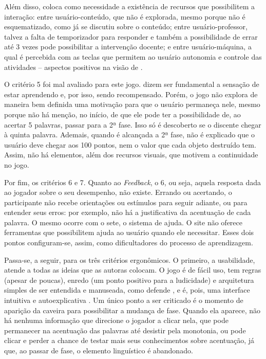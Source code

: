 \documentclass{textolivre}
\begin{document}
Além disso, \textcite{ribeiro2013} coloca como necessidade a existência de recursos que possibilitem a interação: entre usuário-conteúdo, que não é explorada, mesmo porque não é esquematizado, como já se discutiu sobre o conteúdo; entre usuário-professor, talvez a falta de temporizador para responder e também a possibilidade de errar até 3 vezes pode possibilitar a intervenção docente; e entre usuário-máquina, a qual é percebida com as teclas que permitem ao usuário autonomia e controle das atividades  – aspectos positivos na visão de \textcite{ribeiro2013}.

O critério 5 foi mal avaliado para este jogo. \textcite{ribeiro2009} dizem ser fundamental a sensação de estar aprendendo e, por isso, sendo recompensado. Porém, o jogo não explora de maneira bem definida uma motivação para que o usuário permaneça nele, mesmo porque não há menção, no início, de que ele pode ter a possibilidade de, ao acertar 5 palavras, passar para a 2ª fase. Isso só é descoberto se o discente chegar à quinta palavra. Ademais, quando é alcançada a 2ª fase, não é explicado que o usuário deve chegar aos 100 pontos, nem o valor que cada objeto destruído tem. Assim, não há elementos, além dos recursos visuais, que motivem a continuidade no jogo.

Por fim, os critérios 6 e 7. Quanto ao \emph{Feedback}, o 6, ou seja, aquela resposta dada ao jogador sobre o seu desempenho, não existe. Errando ou acertando, o participante não recebe orientações ou estímulos para seguir adiante, ou para entender seus erros: por exemplo, não há a justificativa da acentuação de cada palavra. O mesmo ocorre com o sete, o sistema de ajuda. O site não oferece ferramentas que possibilitem ajuda ao usuário quando ele necessitar. Esses dois pontos configuram-se, assim, como dificultadores do processo de aprendizagem.

Passa-se, a seguir, para os três critérios ergonômicos. O primeiro, a usabilidade, atende a todas as ideias que as autoras colocam. O jogo é de fácil uso, tem regras (apesar de poucas), enredo (um ponto positivo para a ludicidade) e arquitetura simples de ser entendida e manuseada, como defende \textcite{ribeiro2013}, e é, pois, uma interface intuitiva e autoexplicativa \cite{ribeiro2009}. Um único ponto a ser criticado é o momento de aparição da caveira para possibilitar a mudança de fase. Quando ela aparece, não há nenhuma informação que direcione o jogador a clicar nela, que pode permanecer na acentuação das palavras até desistir pela monotonia, ou pode clicar e perder a chance de testar mais seus conhecimentos sobre acentuação, já que, ao passar de fase, o elemento linguístico é abandonado.
\end{document}
